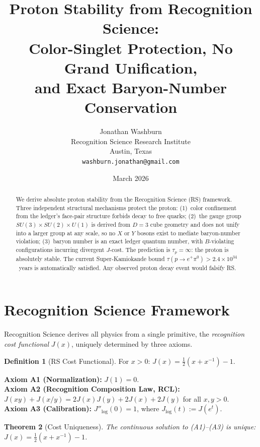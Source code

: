 \documentclass[12pt,a4paper]{article}
\title{Proton Stability from Recognition Science:\\
Color-Singlet Protection, No Grand Unification,\\
and Exact Baryon-Number Conservation}
\author{Jonathan Washburn\\
Recognition Science Research Institute\\
Austin, Texas\\
\texttt{washburn.jonathan@gmail.com}}
\date{March 2026}
\newtheorem{theorem}{Theorem}[section]
\theoremstyle{definition}
\newtheorem{definition}[theorem]{Definition}
\theoremstyle{remark}
\begin{document}
\maketitle

\begin{abstract}
We derive absolute proton stability from the Recognition
Science (RS) framework.  Three independent structural
mechanisms protect the proton: (1)~color confinement from
the ledger's face-pair structure forbids decay to free
quarks; (2)~the gauge group
$SU(3) \times SU(2) \times U(1)$ is derived from
$D = 3$ cube geometry and does not unify into a larger
group at any scale, so no $X$ or $Y$ bosons exist to
mediate baryon-number violation; (3)~baryon number is an
exact ledger quantum number, with $B$-violating
configurations incurring divergent $J$-cost.  The
prediction is $\tau_p = \infty$: the proton is absolutely
stable.  The current Super-Kamiokande bound
$\tau(p \to e^+\pi^0) > 2.4 \times 10^{34}$~years is
automatically satisfied.  Any observed proton decay event
would falsify RS.
\end{abstract}

\section{Recognition Science Framework}
\label{sec:framework}

Recognition Science derives all physics from a single primitive,
the \emph{recognition cost functional} $J(x)$, uniquely determined
by three axioms.

\begin{definition}[RS Cost Functional]
For $x > 0$: $J(x) = \tfrac{1}{2}(x + x^{-1}) - 1$.
\end{definition}

\noindent\textbf{Axiom A1 (Normalization):} $J(1) = 0$.\\
\textbf{Axiom A2 (Recognition Composition Law, RCL):}
$J(xy) + J(x/y) = 2J(x)J(y) + 2J(x) + 2J(y)$ for all $x, y > 0$.\\
\textbf{Axiom A3 (Calibration):} $J''_{\log}(0) = 1$, where
$J_{\log}(t) := J(e^t)$.

\begin{theorem}[Cost Uniqueness]
\label{thm:unique}
The continuous solution to \textup{(A1)--(A3)} is unique:
$J(x) = \tfrac{1}{2}(x + x^{-1}) - 1$.
\end{theorem}
\end{document}
